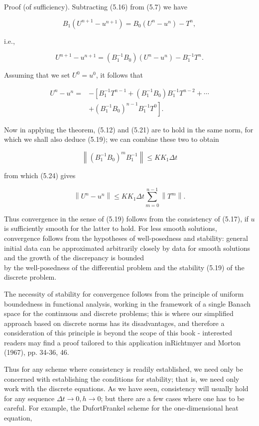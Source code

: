 \documentclass[10pt]{article}
\begin{document}
Proof (of sufficiency). Subtracting (5.16) from (5.7) we have

\[
B_{1}\left(U^{n+1}-u^{n+1}\right)=B_{0}\left(U^{n}-u^{n}\right)-T^{n},
\]

i.e.,

\[
U^{n+1}-u^{n+1}=\left(B_{1}^{-1} B_{0}\right)\left(U^{n}-u^{n}\right)-B_{1}^{-1} T^{n} .
\]

Assuming that we set \(U^{0}=u^{0}\), it follows that

\[
\begin{aligned}
U^{n}-u^{n}= & -\left[B_{1}^{-1} T^{n-1}+\left(B_{1}^{-1} B_{0}\right) B_{1}^{-1} T^{n-2}+\cdots\right. \\
& \left.+\left(B_{1}^{-1} B_{0}\right)^{n-1} B_{1}^{-1} T^{0}\right] .
\end{aligned}
\]

Now in applying the theorem, (5.12) and (5.21) are to hold in the same norm, for which we shall also deduce (5.19); we can combine these two to obtain

\[
\left\|\left(B_{1}^{-1} B_{0}\right)^{m} B_{1}^{-1}\right\| \leq K K_{1} \Delta t
\]

from which (5.24) gives

\[
\left\|U^{n}-u^{n}\right\| \leq K K_{1} \Delta t \sum_{m=0}^{n-1}\left\|T^{m}\right\| .
\]

Thus convergence in the sense of (5.19) follows from the consistency of (5.17), if \(u\) is sufficiently smooth for the latter to hold. For less smooth solutions, convergence follows from the hypotheses of well-posedness and stability: general initial data can be approximated arbitrarily closely by data for smooth solutions and the growth of the discrepancy is bounded\\
by the well-posedness of the differential problem and the stability (5.19) of the discrete problem.

The necessity of stability for convergence follows from the principle of uniform boundedness in functional analysis, working in the framework of a single Banach space for the continuous and discrete problems; this is where our simplified approach based on discrete norms has its disadvantages, and therefore a consideration of this principle is beyond the scope of this book - interested readers may find a proof tailored to this application inRichtmyer and Morton (1967), pp. 34-36, 46.

Thus for any scheme where consistency is readily established, we need only be concerned with establishing the conditions for stability; that is, we need only work with the discrete equations. As we have seen, consistency will usually hold for any sequence \(\Delta t \rightarrow 0, h \rightarrow 0\); but there are a few cases where one has to be careful. For example, the DufortFrankel scheme for the one-dimensional heat equation,
\end{document}
